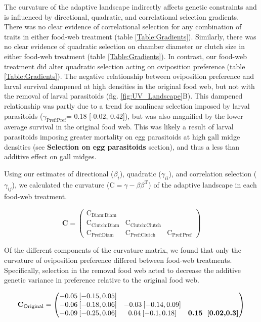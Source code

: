 \documentclass[11pt,]{article}
\begin{document}
\indent The curvature of the adaptive landscape indirectly affects
genetic constraints and is influenced by directional, quadratic, and
correlational selection gradients. There was no clear evidence of
correlational selection for any combination of traits in either food-web
treatment (table \ref{Table:Gradients}). Similarly, there was no clear
evidence of quadratic selection on chamber diameter or clutch size in
either food-web treatment (table \ref{Table:Gradients}). In contrast,
our food-web treatment did alter quadratic selection acting on
oviposition preference (table \ref{Table:Gradients}). The negative
relationship between oviposition preference and larval survival dampened
at high densities in the original food web, but not with the removal of
larval parasitoids (fig. \ref{fig:UV_Landscape}B). This dampened
relationship was partly due to a trend for nonlinear selection imposed
by larval parasitoids (\(\gamma_{\text{Pref:Pref}}\)= 0.18 {[}-0.02,
0.42{]}), but was also magnified by the lower average survival in the
original food web. This was likely a result of larval parasitoids
imposing greater mortality on egg parasitoids at high gall midge
densities (see \textbf{Selection on egg parasitoids} section), and thus
a less than additive effect on gall midges.

Using our estimates of directional (\(\beta_i\)), quadratic
(\(\gamma_{ii}\)), and correlation selection (\(\gamma_{ij}\)), we
calculated the curvature (\(\text{C}=\gamma - \beta \beta^\text{T}\)) of
the adaptive landscape in each food-web treatment.

\[\textbf{C} = \begin{pmatrix} \text{C}_{\text{Diam:Diam}}&& \\ \text{C}_{\text{Clutch:Diam}} & \text{C}_{\text{Clutch:Clutch}} & \\ \text{C}_{\text{Pref:Diam}} & \text{C}_{\text{Pref:Clutch}} & \text{C}_{\text{Pref:Pref}} \end{pmatrix}\]

Of the different components of the curvature matrix, we found that only
the curvature of oviposition preference differed between food-web
treatments. Specifically, selection in the removal food web acted to
decrease the additive genetic variance in preference relative to the
original food web.

\[\textbf{C}_{\text{Original}} = \begin{pmatrix} 
-0.05\: [-0.15,0.05] &  &  \\  
-0.06\: [-0.18,0.06] & -0.03\: [-0.14,0.09] &  \\  
-0.09\: [-0.25,0.06] & 0.04\: [-0.1,0.18] & \textbf{0.15\: [0.02,0.3]} \end{pmatrix}\]
\end{document}
